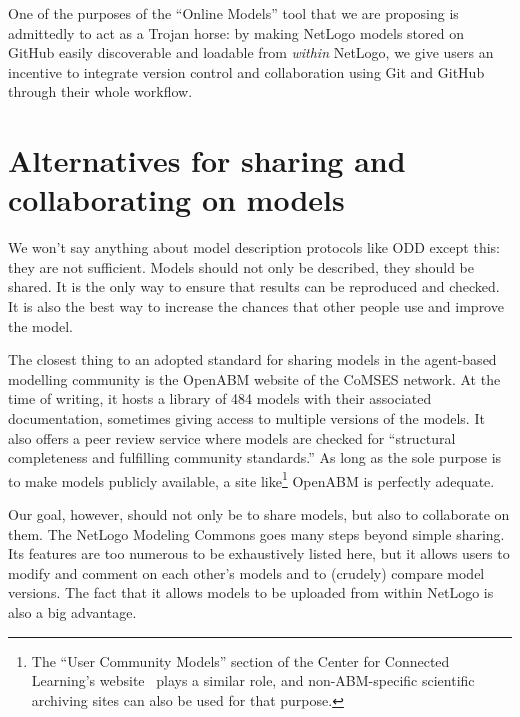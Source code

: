 \documentclass[runningheads]{llncs}
\begin{document}
One of the purposes of the ``Online Models'' tool that we are proposing is admittedly to act as a Trojan horse: by making NetLogo models stored on GitHub easily discoverable and loadable from \emph{within} NetLogo, we give users an incentive to integrate version control and collaboration using Git and GitHub through their whole workflow.

\section{Alternatives for sharing and collaborating on models}

We won't say anything about model description protocols like ODD \cite{grimm_standard_2006,grimm_odd_2010} except this: they are not sufficient. Models should not only be described, they should be shared. It is the only way to ensure that results can be reproduced and checked. It is also the best way to increase the chances that other people use and improve the model.

The closest thing to an adopted standard for sharing models in the agent-based modelling community is the OpenABM website of the CoMSES network\cite{noauthor_comses_nodate}. At the time of writing, it hosts a library of 484 models with their associated documentation, sometimes giving access to multiple versions of the models. It also offers a peer review service where models are checked for ``structural completeness and fulfilling community standards.'' As long as the sole purpose is to make models publicly available, a site like\footnote{The ``User Community Models'' section of the Center for Connected Learning's website \cite{noauthor_netlogo_nodate} plays a similar role, and non-ABM-specific scientific archiving sites\cite{noauthor_dataverse_nodate,noauthor_open_nodate,noauthor_zenodo_nodate} can also be used for that purpose.} OpenABM is perfectly adequate.

Our goal, however, should not only be to share models, but also to collaborate on them. The NetLogo Modeling Commons \cite{lerner_connected_2010,lerner_agent-based_2014} goes many steps beyond simple sharing. Its features are too numerous to be exhaustively listed here, but it allows users to modify and comment on each other's models and to (crudely) compare model versions. The fact that it allows models to be uploaded from within NetLogo is also a big advantage.
\end{document}

